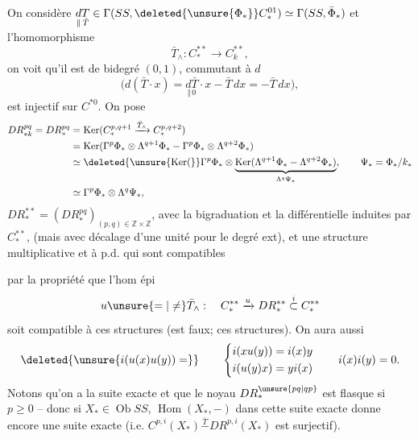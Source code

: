 On considère $\underset{\Vert\,\bar T}{dT}\in
\Gamma(SS,\deleted{\unsure{\Phi_*}}C_*^{01})\simeq\Gamma(SS,\bar\Phi_*)$
et l'homomorphisme
\[
\bar T_{\wedge}:C_*^{**}\longrightarrow C_k^{**},
\]
on voit qu'il est de bidegré $(0,1)$, 
commutant à $d$
\[
\bigl(d(\bar T\cdot x)=\underset{\Vert\,0}{d\bar T}\cdot x-\bar T\,dx=-\bar T\,dx\bigr),
\]
est injectif sur $C^{*0}$. On pose
\[
\begin{aligned}
DR_{*k}^{pq}=DR_*^{pq}
&=\operatorname{Ker}(C_*^{p,q+1}\xrightarrow{\bar T_\wedge}C_*^{p,q+2})\\
&=\operatorname{Ker}(\Gamma^p\Phi_*\otimes\Lambda^{q+1}\Phi_*-\Gamma^p\Phi_*\otimes\Lambda^{q+2}\Phi_*)\\
&\simeq\deleted{\unsure{\operatorname{Ker}(}}\Gamma^p\Phi_*\otimes
\underbrace{\operatorname{Ker}(\Lambda^{q+1}\Phi_*-\Lambda^{q+2}\Phi_*)}_{\Lambda^q\Psi_*},
\qquad\Psi_*=\Phi_*/k_*\\
&\simeq\Gamma^p\Phi_*\otimes\Lambda^q\Psi_*,
\end{aligned}
\]
$DR_*^{**}=(DR_*^{pq})_{(p,q)\in\mathbb Z\times\mathbb Z}$, avec la bigraduation et la différentielle  induites par $C_*^{**}$,
 (mais avec décalage d'une unité pour le degré ext), et une structure multiplicative  et à p.d. qui sont compatibles

par la propriété que l'hom épi
\[
u\unsure{=|\ne}\bar T_\wedge:\quad C_*^{**}\xrightarrow{u}DR_*^{**}\overset{i}{\subset}C_*^{**}
\]
soit compatible à ces structures (est faux;  \uline{} ces structures).
On aura aussi
\[
\deleted{\unsure{i(u(x)u(y))=}}\qquad
\left\{\begin{aligned}
i(xu(y))&=i(x)y\\
i(u(y)x)&=yi(x)
\end{aligned}\right.
\qquad i(x)i(y)=0 .
\]
Notons qu'on a la suite exacte
et que le noyau $DR_*^{\unsure{pq|qp}}$ est flasque si $p\geq0$ --
donc si $X_*\in\operatorname{Ob}SS$, $\operatorname{Hom}(X_*,-)$ dans cette suite exacte donne encore une suite exacte
(i.e.  $C^{p,i}(X_*)\overset{\bar T}{-}DR^{p,i}(X_*)$ est surjectif).

